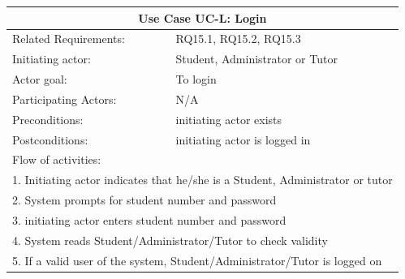\documentclass[12pt]{article}
\begin{document}
{				
		\begin{tabular}{| l | p{10cm}| }
			\hline\multicolumn{2}{|c|}{ \textbf{Use Case UC-L: Login}} \\ \hline
			Related Requirements: & RQ15.1, RQ15.2, RQ15.3  \\ \hline
			Initiating actor: & Student, Administrator or Tutor \\ \hline
			Actor goal: & To login\\ \hline
			Participating Actors: &N/A\\ \hline
			Preconditions: &initiating actor exists\\ \hline
			Postconditions: & initiating actor is logged in\\ \hline
			\multicolumn{2}{|l|}{Flow of activities:}\\ \hline
			\multicolumn{2}{|p{15cm}|}{1. Initiating actor indicates that he/she is a Student, Administrator or tutor}\\
			\multicolumn{2}{|p{15cm}|}{2. System prompts for student number and password}\\ 
			\multicolumn{2}{|p{15cm}|}{3. initiating actor enters student number and password}\\
			\multicolumn{2}{|l|}{4. System reads Student/Administrator/Tutor to check validity}\\
			\multicolumn{2}{|l|}{5. If a valid user of the system, Student/Administrator/Tutor is logged on}	\\
			 \hline		
		\end{tabular}
		


}
\end{document}
